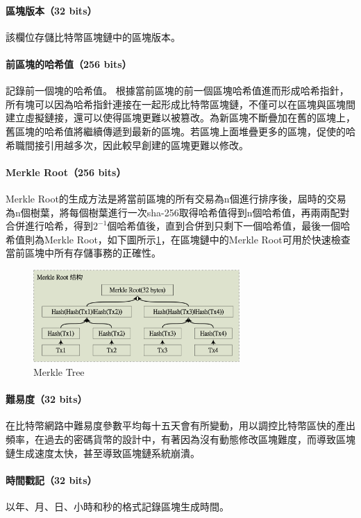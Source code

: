 			\paragraph{區塊版本（32 bits）}該欄位存儲比特幣區塊鏈中的區塊版本。
			\paragraph{前區塊的哈希值（256 bits）}記錄前一個塊的哈希值。 根據當前區塊的前一個區塊哈希值進而形成哈希指針，所有塊可以因為哈希指針連接在一起形成比特幣區塊鏈，不僅可以在區塊與區塊間建立虛擬鏈接，還可以使得區塊更難以被篡改。為新區塊不斷疊加在舊的區塊上，舊區塊的哈希值將繼續傳遞到最新的區塊。若區塊上面堆疊更多的區塊，促使的哈希職間接引用越多次，因此較早創建的區塊更難以修改。
			\paragraph{Merkle Root（256 bits）}Merkle Root的生成方法是將當前區塊的所有交易為n個進行排序後，屆時的交易為n個樹葉，將每個樹葉進行一次sha-256取得哈希值得到n個哈希值，再兩兩配對合併進行哈希，得到$2^{-1}$個哈希值後，直到合併到只剩下一個哈希值，最後一個哈希值則為Merkle Root，如下圖所示\ref{MerkleRoot}，在區塊鏈中的Merkle Root可用於快速檢查當前區塊中所有存儲事務的正確性。

			\begin{figure}[h]
				\centering
				\includegraphics[width = 0.7\textwidth]{MerkleRoot.png}
				\caption{Merkle Tree}\label{MerkleRoot}
			\end{figure}

			
			\paragraph{難易度（32 bits）}在比特幣網路中難易度參數平均每十五天會有所變動，用以調控比特幣區快的產出頻率，在過去的密碼貨幣的設計中，有著因為沒有動態修改區塊難度，而導致區塊鏈生成速度太快，甚至導致區塊鏈系統崩潰。
			\paragraph{時間戳記（32 bits）}以年、月、日、小時和秒的格式記錄區塊生成時間。

